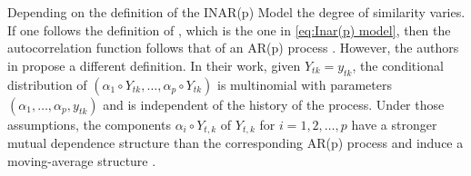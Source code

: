 Depending on the definition of the INAR(p) Model the degree of similarity varies. If one follows the definition of \cite{Guan:1991}, which is the one in \ref{eq:Inar(p) model}, then the autocorrelation function follows that of an AR(p) process \cite{Oliveira:2005}. However, the authors in \cite{Alzaid:1990} propose a different definition. In their work, given $Y_{tk}=y_{tk}$, the conditional distribution of $(\alpha_1 \circ Y_{tk}, \ldots, \alpha_p \circ Y_{tk})$ is multinomial with parameters $( \alpha_1,\ldots,\alpha_p,y_{tk})$ and is independent of the history of the process. Under those assumptions, the components $\alpha_i \circ Y_{t,k}$ of $Y_{t,k}$ for $i=1,2,\ldots,p$  have a stronger mutual dependence structure than the corresponding AR(p) process and induce a moving-average structure \cite{Alzaid:1990}.